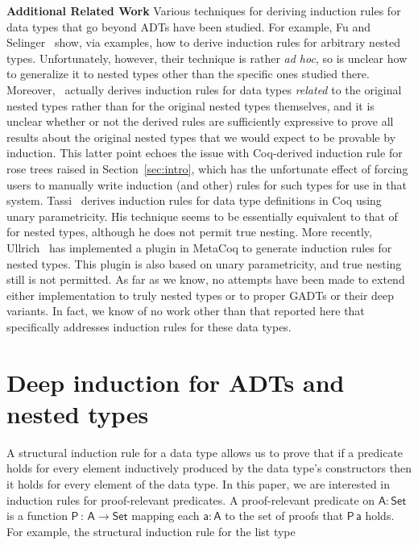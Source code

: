 \documentclass[9pt]{entcs}
\begin{document}
\vspace*{0.05in}

{\bf Additional Related Work\/} Various techniques for deriving
induction rules for data types that go beyond ADTs have been
studied. For example, Fu and Selinger~\cite{fs18} show, via examples,
how to derive induction rules for arbitrary nested
types. Unfortunately, however, their technique is rather {\em ad hoc},
so is unclear how to generalize it to nested types other than the
specific ones studied there. Moreover,~\cite{fs18} actually derives
induction rules for data types {\em related} to the original nested
types rather than for the original nested types themselves, and it is
unclear whether or not the derived rules are sufficiently expressive
to prove all results about the original nested types that we would
expect to be provable by induction. This latter point echoes the issue
with Coq-derived induction rule for rose trees raised in
Section~\ref{sec:intro}, which has the unfortunate effect of forcing
users to manually write induction (and other) rules for such types for
use in that system. Tassi~\cite{tas19} derives induction rules for
data type definitions in Coq using unary parametricity. His technique
seems to be essentially equivalent to that of~\cite{jp19} for nested
types, although he does not permit true nesting. More recently,
Ullrich~\cite{ull20} has implemented a plugin in MetaCoq to generate
induction rules for nested types. This plugin is also based on unary
parametricity, and true nesting still is not permitted.  As far as we
know, no attempts have been made to extend either implementation to
truly nested types or to proper GADTs or their deep variants. In fact,
we know of no work other than that reported here that specifically
addresses induction rules for these data types.

\section{Deep induction for ADTs and nested types}\label{sec:ADTs-and-nesteds}

A structural induction rule for a data type allows us to prove that if
a predicate holds for every element inductively produced by the data
type's constructors then it holds for every element of the data type.
In this paper, we are interested in induction rules for proof-relevant
predicates.  A proof-relevant predicate on $\mathsf{A : Set}$ is a
function $\mathsf{P\,:\,A \to Set}$ mapping each $\mathsf{a : A}$ to
the set of proofs that $\mathsf{P\,a}$ holds.  For example, the
structural induction rule for the list type
\end{document}
